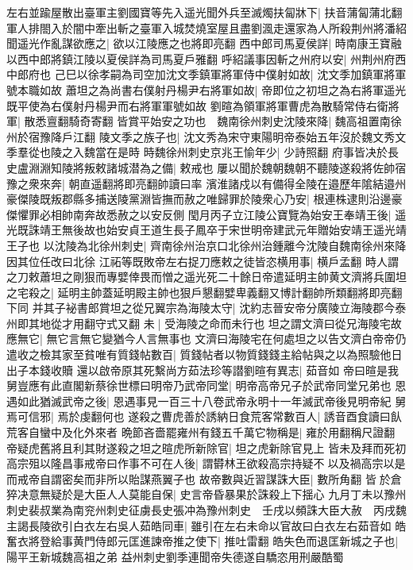 左右並踰屋散出臺軍主劉國寶等先入遥光聞外兵至滅燭扶匐牀下|{
	扶音蒲匐蒲北翻}
軍人排閤入於闇中牽出斬之臺軍入城焚燒室屋且盡劉渢走還家為人所殺荆州將潘紹聞遥光作亂謀欲應之|{
	欲以江陵應之也將即亮翻}
西中郎司馬夏侯詳|{
	時南康王寶融以西中郎將鎮江陵以夏侯詳為司馬夏戶雅翻}
呼紹議事因斬之州府以安|{
	州荆州府西中郎府也}
己巳以徐孝嗣為司空加沈文季鎮軍將軍侍中僕射如故|{
	沈文季加鎮軍將軍號本職如故}
蕭坦之為尚書右僕射丹楊尹右將軍如故|{
	帝即位之初坦之為右將軍遥光既平使為右僕射丹楊尹而右將軍軍號如故}
劉暄為領軍將軍曹虎為散騎常侍右衛將軍|{
	散悉亶翻騎奇寄翻}
皆賞平始安之功也　魏南徐州刺史沈陵來降|{
	魏高祖置南徐州於宿豫降戶江翻}
陵文季之族子也|{
	沈文秀為宋守東陽明帝泰始五年沒於魏文秀文季羣從也陵之入魏當在是時}
時魏徐州刺史京兆王愉年少|{
	少詩照翻}
府事皆决於長史盧淵淵知陵將叛敕諸城潜為之備|{
	敕戒也}
屢以聞於魏朝魏朝不聽陵遂殺將佐帥宿豫之衆來奔|{
	朝直遥翻將即亮翻帥讀曰率}
濱淮諸戍以有備得全陵在邉歷年隂結邉州豪傑陵既叛郡縣多捕送陵黨淵皆撫而赦之唯歸罪於陵衆心乃安|{
	根連株逮則沿邊豪傑懼罪必相帥南奔故悉赦之以安反側}
閠月丙子立江陵公寶覽為始安王奉靖王後|{
	遥光既誅靖王無後故也始安貞王道生長子鳳卒于宋世明帝建武元年贈始安靖王遥光靖王子也}
以沈陵為北徐州刺史|{
	齊南徐州治京口北徐州治鍾離今沈陵自魏南徐州來降因其位任改曰北徐}
江祏等既敗帝左右捉刀應敕之徒皆恣横用事|{
	横戶孟翻}
時人謂之刀敕蕭坦之剛狠而專嬖倖畏而憎之遥光死二十餘日帝遣延明主帥黄文濟將兵圍坦之宅殺之|{
	延明主帥蓋延明殿主帥也狠戶懇翻嬖卑義翻又博計翻帥所類翻將即亮翻下同}
并其子袐書郎賞坦之從兄翼宗為海陵太守|{
	沈約志晉安帝分廣陵立海陵郡今泰州即其地從才用翻守式又翻}
未|{
	受海陵之命而未行也}
坦之謂文濟曰從兄海陵宅故應無它|{
	無它言無它變猶今人言無事也}
文濟曰海陵宅在何處坦之以告文濟白帝帝仍遣收之檢其家至貧唯有質錢帖數百|{
	質錢帖者以物質錢錢主給帖與之以為照驗他日出子本錢收贖}
還以啟帝原其死繫尚方茹法珍等譛劉暄有異志|{
	茹音如}
帝曰暄是我舅豈應有此直閣新蔡徐世標曰明帝乃武帝同堂|{
	明帝高帝兄子於武帝同堂兄弟也}
恩遇如此猶滅武帝之後|{
	恩遇事見一百三十八卷武帝永明十一年滅武帝後見明帝紀}
舅焉可信邪|{
	焉於虔翻何也}
遂殺之曹虎善於誘納日食荒客常數百人|{
	誘音酉食讀曰飤荒客自蠻中及化外來者}
晩節吝嗇罷雍州有錢五千萬它物稱是|{
	雍於用翻稱尺證翻}
帝疑虎舊將且利其財遂殺之坦之暄虎所新除官|{
	坦之虎新除官見上}
皆未及拜而死初高宗殂以隆昌事戒帝曰作事不可在人後|{
	謂欎林王欲殺高宗持疑不以及禍高宗以是而戒帝自謂密矣而非所以貽謀燕翼子也}
故帝數與近習謀誅大臣|{
	數所角翻}
皆於倉猝决意無疑於是大臣人人莫能自保|{
	史言帝昏暴果於誅殺上下揺心}
九月丁未以豫州刺史裴叔業為南兖州刺史征虜長史張冲為豫州刺史　壬戌以頻誅大臣大赦　丙戌魏主謁長陵欲引白衣左右吳人茹皓同車|{
	雖引在左右未命以官故曰白衣左右茹音如}
皓奮衣將登給事黄門侍郎元匡進諫帝推之使下|{
	推吐雷翻}
皓失色而退匡新城之子也|{
	陽平王新城魏高祖之弟}
益州刺史劉季連聞帝失德遂自驕恣用刑嚴酷蜀

